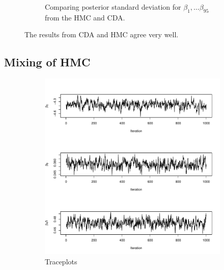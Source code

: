 \documentclass[10pt]{article}
\begin{document}
\begin{figure}[H]
\begin{subfigure}[b]{0.45\textwidth}
 \caption{Comparing posterior standard deviation for $\beta_1,\dots \beta_{95}$ from the HMC and CDA.}
 \end{subfigure}  
 \caption{The results from CDA and HMC agree very well.}
 \end{figure}

\subsection{Mixing of HMC}


 \begin{figure}[H]
   \begin{subfigure}[b]{0.45\textwidth}
 \includegraphics[width=1\textwidth]{traceplot_poisson_ada.pdf}
 \caption{Traceplots}
 \end{subfigure}
  \hfill 
 \begin{subfigure}[b]{0.45\textwidth}

\end{subfigure}
\end{figure}
\end{document}
